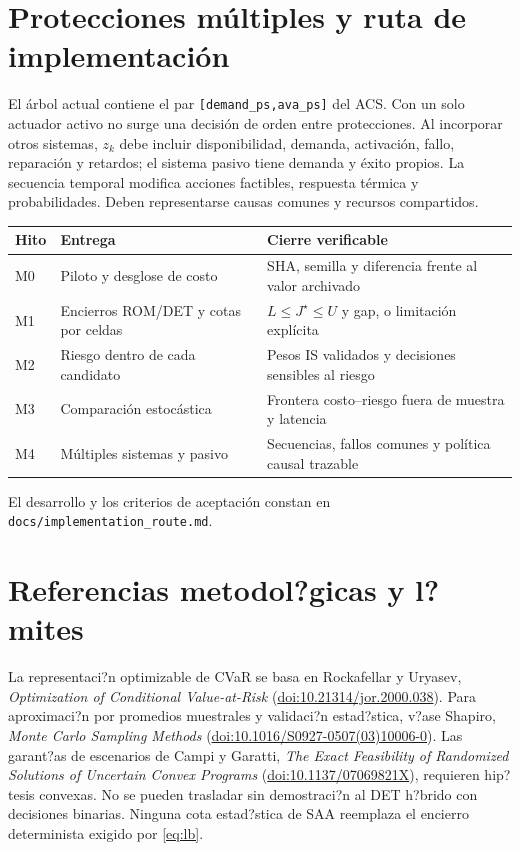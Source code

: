 \documentclass[11pt,a4paper]{article}
\begin{document}
\section{Protecciones múltiples y ruta de implementación}
El árbol actual contiene el par \texttt{[demand\_ps,ava\_ps]} del ACS.
Con un solo actuador activo no surge una decisión de orden entre
protecciones. Al incorporar otros sistemas, $z_k$ debe incluir
disponibilidad, demanda, activación, fallo, reparación y retardos;
el sistema pasivo tiene demanda y éxito propios. La secuencia temporal
modifica acciones factibles, respuesta térmica y probabilidades.
Deben representarse causas comunes y recursos compartidos.

\begin{center}
\begin{tabular}{@{}p{12mm}p{68mm}p{63mm}@{}}
\toprule
Hito & Entrega & Cierre verificable\\
\midrule
M0 & Piloto y desglose de costo & SHA, semilla y diferencia frente al valor archivado\\
M1 & Encierros ROM/DET y cotas por celdas & $L\leq J^\star\leq U$ y gap, o limitación explícita\\
M2 & Riesgo dentro de cada candidato & Pesos IS validados y decisiones sensibles al riesgo\\
M3 & Comparación estocástica & Frontera costo--riesgo fuera de muestra y latencia\\
M4 & Múltiples sistemas y pasivo & Secuencias, fallos comunes y política causal trazable\\
\bottomrule
\end{tabular}
\end{center}
El desarrollo y los criterios de aceptación constan en
\texttt{docs/implementation\_route.md}.
\section{Referencias metodol?gicas y l?mites}
La representaci?n optimizable de CVaR se basa en Rockafellar y
Uryasev, \emph{Optimization of Conditional Value-at-Risk}
(\href{https://doi.org/10.21314/jor.2000.038}{doi:10.21314/jor.2000.038}).
Para aproximaci?n por promedios muestrales y validaci?n estad?stica,
v?ase Shapiro, \emph{Monte Carlo Sampling Methods}
(\href{https://doi.org/10.1016/S0927-0507(03)10006-0}
{doi:10.1016/S0927-0507(03)10006-0}).
Las garant?as de escenarios de Campi y Garatti,
\emph{The Exact Feasibility of Randomized Solutions of Uncertain
Convex Programs}
(\href{https://doi.org/10.1137/07069821X}{doi:10.1137/07069821X}),
requieren hip?tesis convexas. No se pueden trasladar sin demostraci?n
al DET h?brido con decisiones binarias. Ninguna cota estad?stica de SAA
reemplaza el encierro determinista exigido por \eqref{eq:lb}.
\end{document}
